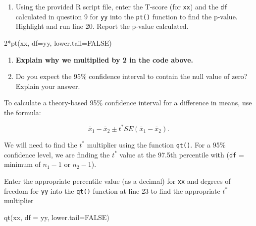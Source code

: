 \documentclass[
]{report}
\newenvironment{Shaded}{\begin{snugshade}}{\end{snugshade}}
\newcommand{\AttributeTok}[1]{\textcolor[rgb]{0.77,0.63,0.00}{#1}}
\newcommand{\ConstantTok}[1]{\textcolor[rgb]{0.00,0.00,0.00}{#1}}
\newcommand{\DecValTok}[1]{\textcolor[rgb]{0.00,0.00,0.81}{#1}}
\newcommand{\FunctionTok}[1]{\textcolor[rgb]{0.00,0.00,0.00}{#1}}
\newcommand{\NormalTok}[1]{#1}
\newcommand{\SpecialCharTok}[1]{\textcolor[rgb]{0.00,0.00,0.00}{#1}}
\providecommand{\tightlist}{%
  \setlength{\itemsep}{0pt}\setlength{\parskip}{0pt}}
\begin{document}
\vspace{0.2in}
\newpage

\begin{enumerate}
\def\labelenumi{\arabic{enumi}.}
\setcounter{enumi}{9}
\tightlist
\item
  Using the provided R script file, enter the T-score (for \texttt{xx}) and the \texttt{df} calculated in question 9 for \texttt{yy} into the \texttt{pt()} function to find the p-value. Highlight and run line 20. Report the p-value calculated.
\end{enumerate}

\begin{Shaded}
\begin{Highlighting}[]
\DecValTok{2}\SpecialCharTok{*}\FunctionTok{pt}\NormalTok{(xx, }\AttributeTok{df=}\NormalTok{yy, }\AttributeTok{lower.tail=}\ConstantTok{FALSE}\NormalTok{)}
\end{Highlighting}
\end{Shaded}

\vspace{0.2in}

\begin{enumerate}
\def\labelenumi{\arabic{enumi}.}
\setcounter{enumi}{10}
\item
  \textbf{Explain why we multiplied by 2 in the code above.}
  \vspace{0.3in}
\item
  Do you expect the 95\% confidence interval to contain the null value of zero? Explain your answer.
  \vspace{0.8in}
\end{enumerate}

To calculate a theory-based 95\% confidence interval for a difference in means, use the formula:

\[\bar{x}_1- \bar{x}_2\pm t^* SE(\bar{x}_1- \bar{x}_2).\]

We will need to find the \(t^*\) multiplier using the function \texttt{qt()}. For a 95\% confidence level, we are finding the \(t^*\) value at the 97.5th percentile with (\texttt{df} = minimum of \(n_1 - 1\) or \(n_2 - 1\)).

Enter the appropriate percentile value (as a decimal) for \texttt{xx} and degrees of freedom for \texttt{yy} into the \texttt{qt()} function at line 23 to find the appropriate \(t^*\) multiplier

\begin{Shaded}
\begin{Highlighting}[]
\FunctionTok{qt}\NormalTok{(xx, }\AttributeTok{df =}\NormalTok{ yy, }\AttributeTok{lower.tail=}\ConstantTok{FALSE}\NormalTok{)}
\end{Highlighting}
\end{Shaded}
\end{document}
